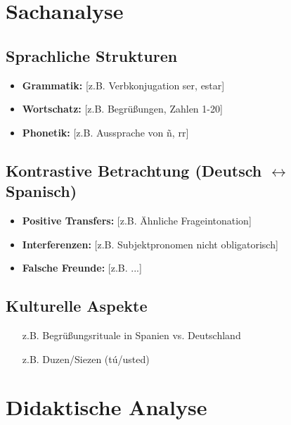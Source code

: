 \documentclass[11pt,a4paper]{article}
\begin{document}
\section{Sachanalyse}

\subsection{Sprachliche Strukturen}
\begin{itemize}
    \item \textbf{Grammatik:} [z.B. Verbkonjugation ser, estar]
    \item \textbf{Wortschatz:} [z.B. Begrüßungen, Zahlen 1-20]
    \item \textbf{Phonetik:} [z.B. Aussprache von ñ, rr]
\end{itemize}

\subsection{Kontrastive Betrachtung (Deutsch $\leftrightarrow$ Spanisch)}
\begin{itemize}
    \item \textbf{Positive Transfers:} [z.B. Ähnliche Frageintonation]
    \item \textbf{Interferenzen:} [z.B. Subjektpronomen nicht obligatorisch]
    \item \textbf{Falsche Freunde:} [z.B. ...]
\end{itemize}

\subsection{Kulturelle Aspekte}
\begin{itemize}
    \item [z.B. Begrüßungsrituale in Spanien vs. Deutschland]
    \item [z.B. Duzen/Siezen (tú/usted)]
\end{itemize}

\section{Didaktische Analyse}
\end{document}
